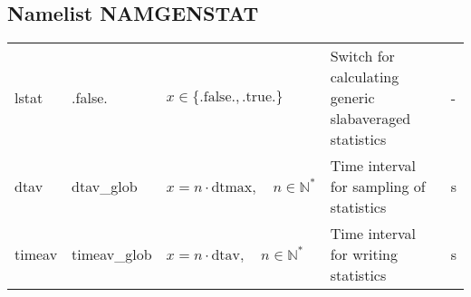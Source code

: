 \documentclass[twoside,11pt,fleqn,a4paper,english,openright]{report}
\begin{document}
\subsection{Namelist NAMGENSTAT}\label{par:namgenstat}
\begin{center}
  \tabletail{
        &&&&\\\hline
  }
  \tablelasttail{
        &&&&\\\hline
  }
\begin{supertabular}{|l|p{2cm}|p{4cm}|p{6cm}|l|}
  lstat		& .false.	& $x\in\{\text{.false.},\text{.true.}\}$	& Switch for calculating generic slabaveraged statistics	& -\\
  dtav		& dtav\_glob	& $x = n \cdot \text{dtmax}, \quad n \in \mathbb{N}^*$	& Time interval for sampling of statistics	& s\\
  timeav	& timeav\_glob	& $x = n \cdot \text{dtav}, \quad n \in \mathbb{N}^*$	& Time interval for writing statistics		& s\\
\end{supertabular}
\end{center}

\end{document}
